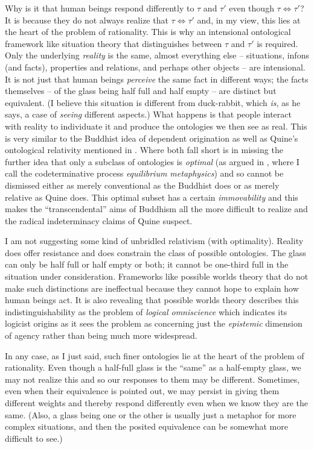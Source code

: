 Why is it that human beings respond differently to $\tau$ and $\tau'$ even though $\tau \Longleftrightarrow \tau'$? It is because they do not always realize that $\tau \Longleftrightarrow \tau'$ and, in my view, this lies at the heart of the problem of rationality. This is why an intensional ontological framework like situation theory that distinguishes between $\tau$ and $\tau'$ is required. Only the underlying \emph{reality} is the same, almost everything else -- situations, infons (and facts), properties and relations, and perhaps other objects -- are intensional. It is not just that human beings \emph{perceive} the same fact in different ways; the facts themselves -- of the glass being half full and half empty -- are distinct but equivalent. (I believe this situation is different from  duck-rabbit, which \emph{is}, as he says, a case of \emph{seeing} different aspects.) What happens is that people interact with reality to individuate it and produce the ontologies we then see as real. This is very similar to the Buddhist idea of dependent origination as well as Quine's ontological relativity mentioned in . Where both fall short is in missing the further idea that only a subclass of ontologies is \emph{optimal} (as argued in  \citet[Section~7.6]{parikh:le}, where I call the codeterminative process \emph{equilibrium metaphysics}) and so cannot be dismissed either as merely conventional as the Buddhist  does or as merely relative as Quine does. This optimal subset has a certain \emph{immovability} and this makes the ``transcendental'' aims of Buddhism all the more difficult to realize and the radical indeterminacy claims of Quine suspect.

I am not suggesting some kind of unbridled relativism (with optimality). Reality does offer resistance and does constrain the class of possible ontologies. The glass can only be half full or half empty or both; it cannot be one-third full in the situation under consideration. Frameworks like possible worlds theory that do not make such distinctions are ineffectual because they cannot hope to explain how human beings act. It is also revealing that possible worlds theory describes this indistinguishability as the problem of \emph{logical omniscience} which indicates its logicist origins as it sees the problem as concerning just the \emph{epistemic} dimension of agency rather than being much more widespread.

In any case, as I just said, such finer ontologies lie at the heart of the problem of rationality. Even though a half-full glass is the ``same'' as a half-empty glass, we may not realize this and so our responses to them may be different. Sometimes, even when their equivalence is pointed out, we may persist in giving them different weights and thereby respond differently even when we know they are the same. (Also, a glass being one or the other is usually just a metaphor for more complex situations, and then the posited equivalence can be somewhat more difficult to see.)


